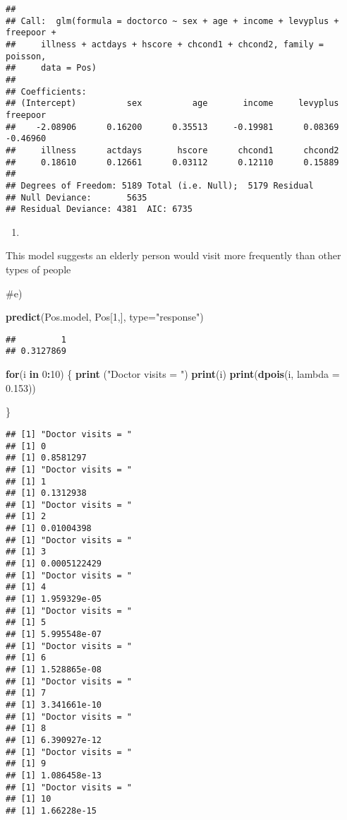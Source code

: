 \documentclass[
]{article}
\newenvironment{Shaded}{\begin{snugshade}}{\end{snugshade}}
\newcommand{\ControlFlowTok}[1]{\textcolor[rgb]{0.13,0.29,0.53}{\textbf{#1}}}
\newcommand{\DataTypeTok}[1]{\textcolor[rgb]{0.13,0.29,0.53}{#1}}
\newcommand{\DecValTok}[1]{\textcolor[rgb]{0.00,0.00,0.81}{#1}}
\newcommand{\FloatTok}[1]{\textcolor[rgb]{0.00,0.00,0.81}{#1}}
\newcommand{\KeywordTok}[1]{\textcolor[rgb]{0.13,0.29,0.53}{\textbf{#1}}}
\newcommand{\NormalTok}[1]{#1}
\newcommand{\OperatorTok}[1]{\textcolor[rgb]{0.81,0.36,0.00}{\textbf{#1}}}
\newcommand{\StringTok}[1]{\textcolor[rgb]{0.31,0.60,0.02}{#1}}
\begin{document}
\begin{verbatim}
## 
## Call:  glm(formula = doctorco ~ sex + age + income + levyplus + freepoor + 
##     illness + actdays + hscore + chcond1 + chcond2, family = poisson, 
##     data = Pos)
## 
## Coefficients:
## (Intercept)          sex          age       income     levyplus     freepoor  
##    -2.08906      0.16200      0.35513     -0.19981      0.08369     -0.46960  
##     illness      actdays       hscore      chcond1      chcond2  
##     0.18610      0.12661      0.03112      0.12110      0.15889  
## 
## Degrees of Freedom: 5189 Total (i.e. Null);  5179 Residual
## Null Deviance:       5635 
## Residual Deviance: 4381  AIC: 6735
\end{verbatim}

\begin{enumerate}
\def\labelenumi{\alph{enumi})}
\setcounter{enumi}{3}
\item
\end{enumerate}

This model suggests an elderly person would visit more frequently than
other types of people

\#e)

\begin{Shaded}
\begin{Highlighting}[]
\KeywordTok{predict}\NormalTok{(Pos.model, Pos[}\DecValTok{1}\NormalTok{,], }\DataTypeTok{type=}\StringTok{"response"}\NormalTok{)}
\end{Highlighting}
\end{Shaded}

\begin{verbatim}
##         1 
## 0.3127869
\end{verbatim}

\begin{Shaded}
\begin{Highlighting}[]
\ControlFlowTok{for}\NormalTok{(i }\ControlFlowTok{in} \DecValTok{0}\OperatorTok{:}\DecValTok{10}\NormalTok{) \{}
  \KeywordTok{print}\NormalTok{ (}\StringTok{"Doctor visits = "}\NormalTok{)}
  \KeywordTok{print}\NormalTok{(i)}
  \KeywordTok{print}\NormalTok{(}\KeywordTok{dpois}\NormalTok{(i, }\DataTypeTok{lambda =} \FloatTok{0.153}\NormalTok{))}
  
\NormalTok{  \}}
\end{Highlighting}
\end{Shaded}

\begin{verbatim}
## [1] "Doctor visits = "
## [1] 0
## [1] 0.8581297
## [1] "Doctor visits = "
## [1] 1
## [1] 0.1312938
## [1] "Doctor visits = "
## [1] 2
## [1] 0.01004398
## [1] "Doctor visits = "
## [1] 3
## [1] 0.0005122429
## [1] "Doctor visits = "
## [1] 4
## [1] 1.959329e-05
## [1] "Doctor visits = "
## [1] 5
## [1] 5.995548e-07
## [1] "Doctor visits = "
## [1] 6
## [1] 1.528865e-08
## [1] "Doctor visits = "
## [1] 7
## [1] 3.341661e-10
## [1] "Doctor visits = "
## [1] 8
## [1] 6.390927e-12
## [1] "Doctor visits = "
## [1] 9
## [1] 1.086458e-13
## [1] "Doctor visits = "
## [1] 10
## [1] 1.66228e-15
\end{verbatim}
\end{document}
